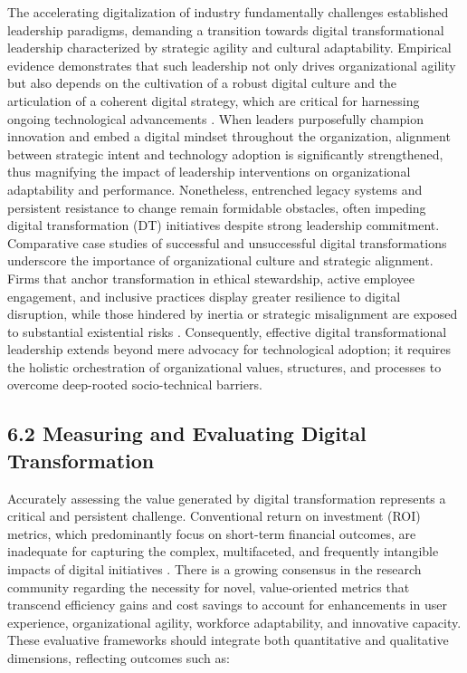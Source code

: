\documentclass[11pt]{article}
\begin{document}
The accelerating digitalization of industry fundamentally challenges established leadership paradigms, demanding a transition towards digital transformational leadership characterized by strategic agility and cultural adaptability. Empirical evidence demonstrates that such leadership not only drives organizational agility but also depends on the cultivation of a robust digital culture and the articulation of a coherent digital strategy, which are critical for harnessing ongoing technological advancements \cite{ref93}. When leaders purposefully champion innovation and embed a digital mindset throughout the organization, alignment between strategic intent and technology adoption is significantly strengthened, thus magnifying the impact of leadership interventions on organizational adaptability and performance. Nonetheless, entrenched legacy systems and persistent resistance to change remain formidable obstacles, often impeding digital transformation (DT) initiatives despite strong leadership commitment. Comparative case studies of successful and unsuccessful digital transformations underscore the importance of organizational culture and strategic alignment. Firms that anchor transformation in ethical stewardship, active employee engagement, and inclusive practices display greater resilience to digital disruption, while those hindered by inertia or strategic misalignment are exposed to substantial existential risks \cite{ref93}. Consequently, effective digital transformational leadership extends beyond mere advocacy for technological adoption; it requires the holistic orchestration of organizational values, structures, and processes to overcome deep-rooted socio-technical barriers.

\subsection{6.2 Measuring and Evaluating Digital Transformation}

Accurately assessing the value generated by digital transformation represents a critical and persistent challenge. Conventional return on investment (ROI) metrics, which predominantly focus on short-term financial outcomes, are inadequate for capturing the complex, multifaceted, and frequently intangible impacts of digital initiatives \cite{ref94}. There is a growing consensus in the research community regarding the necessity for novel, value-oriented metrics that transcend efficiency gains and cost savings to account for enhancements in user experience, organizational agility, workforce adaptability, and innovative capacity. These evaluative frameworks should integrate both quantitative and qualitative dimensions, reflecting outcomes such as:
\end{document}
